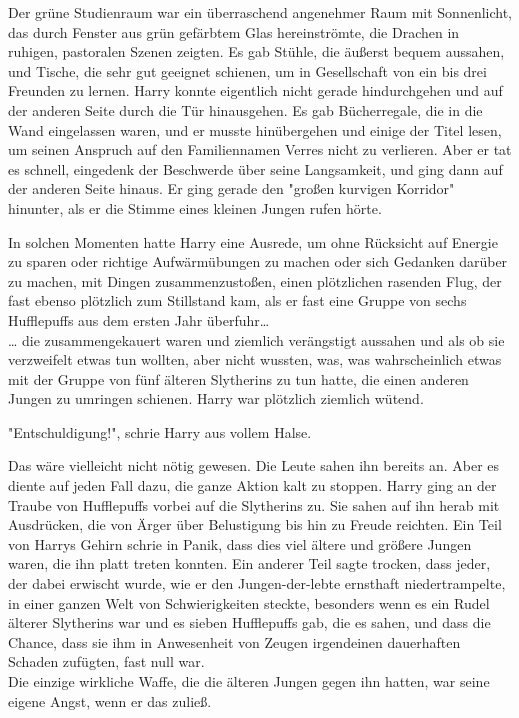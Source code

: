 {Der grüne Studienraum war ein überraschend angenehmer Raum mit Sonnenlicht, das durch Fenster aus grün gefärbtem Glas hereinströmte, die Drachen in ruhigen, pastoralen Szenen zeigten. Es gab Stühle, die äußerst bequem aussahen, und Tische, die sehr gut geeignet schienen, um in Gesellschaft von ein bis drei Freunden zu lernen. Harry konnte eigentlich nicht gerade hindurchgehen und auf der anderen Seite durch die Tür hinausgehen. Es gab Bücherregale, die in die Wand eingelassen waren, und er musste hinübergehen und einige der Titel lesen, um seinen Anspruch auf den Familiennamen Verres nicht zu verlieren. Aber er tat es schnell, eingedenk der Beschwerde über seine Langsamkeit, und ging dann auf der anderen Seite hinaus. Er ging gerade den "großen kurvigen Korridor" hinunter, als er die Stimme eines kleinen Jungen rufen hörte.

In solchen Momenten hatte Harry eine Ausrede, um ohne Rücksicht auf Energie zu sparen oder richtige Aufwärmübungen zu machen oder sich Gedanken darüber zu machen, mit Dingen zusammenzustoßen, einen plötzlichen rasenden Flug, der fast ebenso plötzlich zum Stillstand kam, als er fast eine Gruppe von sechs Hufflepuffs aus dem ersten Jahr überfuhr…\\ … die zusammengekauert waren und ziemlich verängstigt aussahen und als ob sie verzweifelt etwas tun wollten, aber nicht wussten, was, was wahrscheinlich etwas mit der Gruppe von fünf älteren Slytherins zu tun hatte, die einen anderen Jungen zu umringen schienen. Harry war plötzlich ziemlich wütend.

"Entschuldigung!", schrie Harry aus vollem Halse.

Das wäre vielleicht nicht nötig gewesen. Die Leute sahen ihn bereits an. Aber es diente auf jeden Fall dazu, die ganze Aktion kalt zu stoppen. Harry ging an der Traube von Hufflepuffs vorbei auf die Slytherins zu. Sie sahen auf ihn herab mit Ausdrücken, die von Ärger über Belustigung bis hin zu Freude reichten. Ein Teil von Harrys Gehirn schrie in Panik, dass dies viel ältere und größere Jungen waren, die ihn platt treten konnten. Ein anderer Teil sagte trocken, dass jeder, der dabei erwischt wurde, wie er den Jungen-der-lebte ernsthaft niedertrampelte, in einer ganzen Welt von Schwierigkeiten steckte, besonders wenn es ein Rudel älterer Slytherins war und es sieben Hufflepuffs gab, die es sahen, und dass die Chance, dass sie ihm in Anwesenheit von Zeugen irgendeinen dauerhaften Schaden zufügten, fast null war.\\ Die einzige wirkliche Waffe, die die älteren Jungen gegen ihn hatten, war seine eigene Angst, wenn er das zuließ.

}
